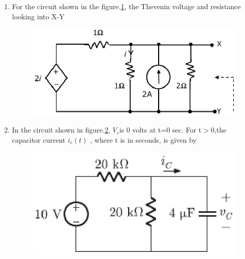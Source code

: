 \documentclass[journal,12pt,twocolumn]{IEEEtran}
\begin{document}
\begin{enumerate}
\item For the circuit shown in the figure.\ref{fig67}, the Thevenin voltage and resistance looking into X-Y
\begin{enumerate}
\setlength\itemsep{2em}
\begin{figure}[!h]
\begin{center}
\includegraphics[scale=0.7]{./figs/fig67.eps}
\caption{}
\label{fig67}
\end{center}
\end{figure}
\end{enumerate}

\item In the circuit shown in figure.\ref{fig68}, $V_{c}$is 0 volts at t=0 sec. For t$ > $0,the capacitor current
$i_{c}(t)$ , where t is in seconds, is given by
\begin{enumerate}
\setlength\itemsep{2em}
\begin{figure}[!h]
\begin{center}
\includegraphics[scale=0.7]{./figs/fig68.eps}
\caption{}
\label{fig68}
\end{center}
\end{figure}
\end{enumerate}


\end{enumerate}
\end{document}
